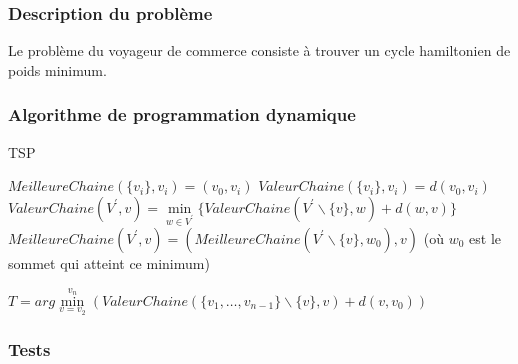\subsubsection{Description du problème}
Le problème du voyageur de commerce consiste à trouver un cycle hamiltonien de poids minimum.
\subsubsection{Algorithme de programmation dynamique}

\begin{algorithm}[H]
	\caption{TSP}
	\begin{algorithmic}[1]
			\STATE $MeilleureChaine(\{v_i\},v_i) = (v_0, v_i)$
			\STATE $ValeurChaine(\{v_i\},v_i) = d(v_0, v_i)$
		\ENDFOR
					\STATE $ValeurChaine(V^{'},v) = \min\limits_{w \in V^{'}}\{ValeurChaine(V^{'}\backslash \{v\},w)+d(w,v)\}$
					\STATE $MeilleureChaine(V^{'},v) = (MeilleureChaine(V^{'}\backslash \{v\},w_0),v)$ (où $w_0$ est le sommet qui atteint ce minimum)
				\ENDFOR
			\ENDFOR
		\ENDFOR
		
		\RETURN $T=arg \min\limits_{v=v_2}^{v_n}(ValeurChaine(\{v_1,\ldots,v_{n-1}\}\backslash \{v\},v)+d(v,v_0))$
	\end{algorithmic}
\end{algorithm}


\subsubsection{Tests}


